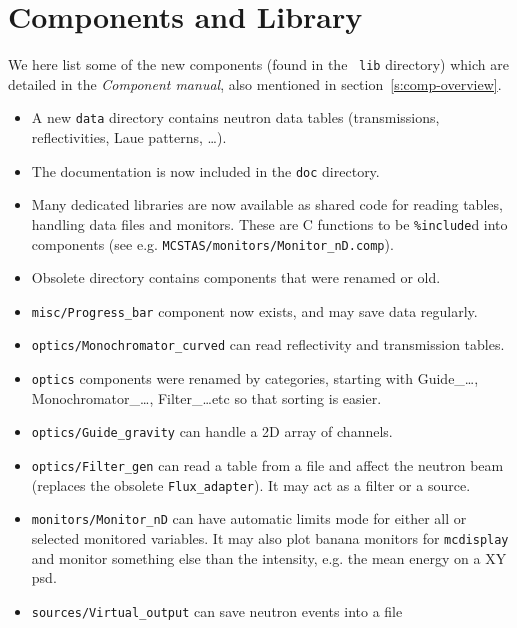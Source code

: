\section{Components and Library} 
\label{s:new-features:components}
 
  
  We here list some of the new components (found in the \MCS\ \verb+lib+ directory) 
which are detailed in the {\it Component manual}, also mentioned in
section~\ref{s:comp-overview}.
  
\begin{itemize}
\item A new \verb+data+ directory contains neutron data tables (transmissions, reflectivities, Laue patterns, \ldots).
\item The documentation is now included in the \verb+doc+ directory.
\item Many dedicated libraries are now available as shared code for reading tables,
    handling data files and monitors. These are C functions to be \texttt{\%include}d
    into components (see e.g. \verb+MCSTAS/monitors/Monitor_nD.comp+).
\item Obsolete directory contains components that were renamed or old.
\item \verb+misc/Progress_bar+ component now exists, and may save data regularly.
\item \verb+optics/Monochromator_curved+ can read reflectivity and transmission tables.
\item \verb+optics+ components were renamed by categories, starting with
   Guide\_\ldots, Monochromator\_\ldots, Filter\_\ldots etc so that sorting is
   easier. 
\item \verb+optics/Guide_gravity+ can handle a 2D array of channels.
\item \verb+optics/Filter_gen+ can read a table from a file and affect the neutron
    beam (replaces the obsolete \verb+Flux_adapter+). It may act as a filter or a
    source.
\item \verb+monitors/Monitor_nD+ can have automatic limits mode for either all or 
    selected monitored variables. It may also plot banana monitors for
    \verb+mcdisplay+ and monitor something else than the intensity, e.g. the mean
    energy on a XY psd. 
\item \verb+sources/Virtual_output+ can save neutron events into a file

\end{itemize}
